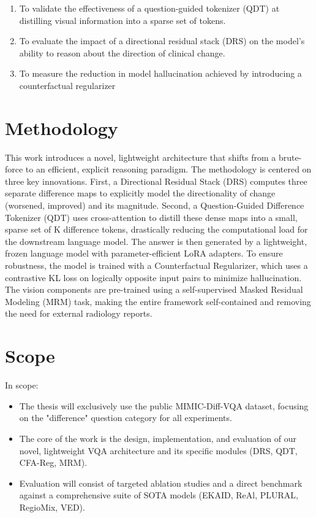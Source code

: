 \begin{enumerate}
    \item To validate the effectiveness of a question-guided tokenizer (QDT) at distilling visual information into a sparse set of tokens.
    \item To evaluate the impact of a directional residual stack (DRS) on the model's ability to reason about the direction of clinical change.
    \item To measure the reduction in model hallucination achieved by introducing a counterfactual regularizer
\end{enumerate}

\section{Methodology}
This work introduces a novel, lightweight architecture that shifts from a brute-force to an efficient, explicit reasoning paradigm. The methodology is centered on three key innovations. First, a Directional Residual Stack (DRS) computes three separate difference maps to explicitly model the directionality of change (worsened, improved) and its magnitude. Second, a Question-Guided Difference Tokenizer (QDT) uses cross-attention to distill these dense maps into a small, sparse set of K difference tokens, drastically reducing the computational load for the downstream language model. The answer is then generated by a lightweight, frozen language model with parameter-efficient LoRA adapters. To ensure robustness, the model is trained with a Counterfactual Regularizer, which uses a contrastive KL loss on logically opposite input pairs to minimize hallucination. The vision components are pre-trained using a self-supervised Masked Residual Modeling (MRM) task, making the entire framework self-contained and removing the need for external radiology reports.

\section{Scope}
In scope:
\begin{itemize}
    \item The thesis will exclusively use the public MIMIC-Diff-VQA dataset, focusing on the "difference" question category for all experiments.
    \item The core of the work is the design, implementation, and evaluation of our novel, lightweight VQA architecture and its specific modules (DRS, QDT, CFA-Reg, MRM).
    \item Evaluation will consist of targeted ablation studies and a direct benchmark against a comprehensive suite of SOTA models (EKAID, ReAl, PLURAL, RegioMix, VED).
\end{itemize}

